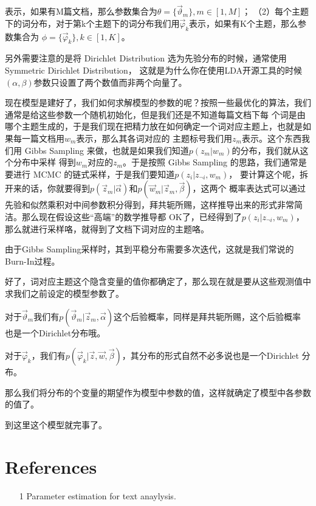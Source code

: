 \documentclass[UTF8]{ctexart}
\begin{document}
表示，如果有M篇文档，那么参数集合为$\theta = \{\vec{\vartheta}_m\}, m \in [1, M]$；
（2）每个主题下的词分布，对于第k个主题下的词分布我们用$\vec{\varphi}_k$表示，如果有K个主题，那么参数集合为
$\phi = \{ \vec{\varphi}_k \}, k \in [1, K]$。
\par
另外需要注意的是将 Dirichlet Distribution 选为先验分布的时候，通常使用Symmetric Dirichlet Distribution，
这就是为什么你在使用LDA开源工具的时候$(\alpha,\beta)$参数只设置了两个数值而非两个向量了。
\par
现在模型是建好了，我们如何求解模型的参数的呢？按照一些最优化的算法，我们通常是给这些参数一个随机初始化，但是我们还是不知道每篇文档下每
个词是由哪个主题生成的，于是我们现在把精力放在如何确定一个词对应主题上，也就是如果每一篇文档用$w_m$表示，那么其各词对应的
主题标号我们用$z_m$表示。这个东西我们用 Gibbs Sampling 来做，也就是如果我们知道$p(z_m|w_m)$的分布，我们就从这个分布中采样
得到$w_m$对应的$z_m$。于是按照 Gibbs Sampling 的思路，我们通常是要进行 MCMC 的链式采样，于是我们要知道$p(z_i|z_{\neg i}, w_m)$，
要计算这个呢，拆开来的话，你就要得到$p(\vec{z}_m|\vec{\alpha})$和$p(\vec{w}_m|\vec{z}_m, \vec{\beta})$，这两个
概率表达式可以通过先验和似然乘积对中间参数积分得到，拜共轭所赐，这样推导出来的形式非常简洁。那么现在假设这些“高端”的数学推导都
OK了，已经得到了$p(z_i|z_{\neg i}, w_m)$，那么就进行采样咯，就得到了文档下词对应的主题咯。
\par
由于Gibbs Sampling采样时，其到平稳分布需要多次迭代，这就是我们常说的Burn-In过程。
\par
好了，词对应主题这个隐含变量的值你都确定了，那么现在就是要从这些观测值中求我们之前设定的模型参数了。
\par
对于$\vec{\vartheta}_m$我们有$p(\vec{\vartheta}_m|\vec{z}_m,\vec{\alpha})$这个后验概率，同样是拜共轭所赐，这个后验概率
也是一个Dirichlet分布哦。
\par
对于$\vec{\varphi}_k$，我们有$p(\vec{\varphi}_k|\vec{z},\vec{w}, \vec{\beta})$，其分布的形式自然不必多说也是一个Dirichlet
分布。
\par
那么我们将分布的个变量的期望作为模型中参数的值，这样就确定了模型中各参数的值了。
\par
到这里这个模型就完事了。

\section{References}
\begin{itemize}
\item[1] Parameter estimation for text anaylysis.
\end{itemize}
\end{document}
